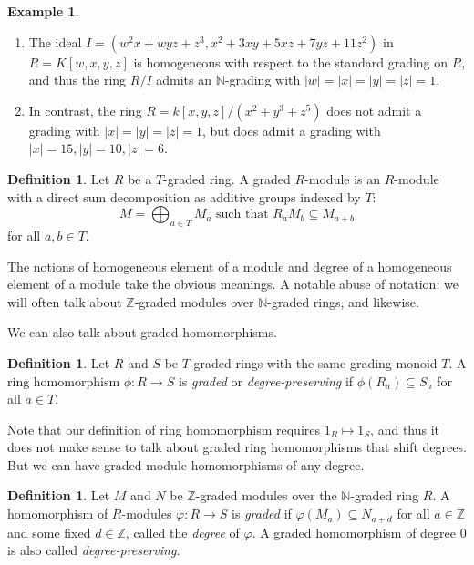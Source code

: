 \documentclass{amsart}[12pt]
\newcommand{\ZZ}{\mathbb{Z}}
\newcommand{\NN}{\mathbb{N}}
\numberwithin{equation}{section}
\theoremstyle{plain} %
\theoremstyle{definition}
\newtheorem{definition}[equation]{Definition}
\newtheorem{example}[equation]{Example}
\theoremstyle{remark}
\begin{document}
\begin{example}
	\begin{enumerate}
		
		\item The ideal $I = (w^2x+wyz+z^3,x^2+3xy+5xz+7yz+11z^2)$ in $R=K[w,x,y,z]$ is homogeneous with respect to the standard grading on $R$, and thus the ring $R/I$ admits an $\NN$-grading with $|w|=|x|=|y|=|z|=1$.
		
		\item In contrast, the ring $R=k[x,y,z]/(x^2+y^3+z^5)$ does not admit a grading with $|x|=|y|=|z|=1$, but does admit a grading with $|x|=15,|y|=10,|z|=6$.
	\end{enumerate}
\end{example}

\begin{definition}
Let $R$ be a $T$-graded ring. A graded $R$-module is an $R$-module with a direct sum decomposition as additive groups indexed by $T$:
	\[M=\bigoplus_{a\in T} M_a \textrm{ such that } R_a M_b \subseteq M_{a+b}\] for all $a,b\in T$.
	\end{definition}
	
	The notions of homogeneous element of a module and degree of a homogeneous element of a module take the obvious meanings. A notable abuse of notation: we will often talk about $\ZZ$-graded modules over $\NN$-graded rings, and likewise.
	
	We can also talk about graded homomorphisms.
	
\begin{definition}
Let $R$ and $S$ be $T$-graded rings with the same grading monoid $T$. A ring homomorphism $\phi:R\to S$ is {\em graded} or {\em degree-preserving}  if $\phi(R_a) \subseteq S_{a}$ for all $a \in T$.
\end{definition}

Note that our definition of ring homomorphism requires $1_R \mapsto 1_S$, and thus it does not make sense to talk about graded ring homomorphisms that shift degrees. But we can have graded module homomorphisms of any degree.

\begin{definition}	
Let $M$ and $N$ be $\ZZ$-graded modules over the $\NN$-graded ring $R$. A homomorphism of $R$-modules $\varphi:R\to S$ is {\em graded}  if $\varphi(M_a) \subseteq N_{a+d}$ for all $a \in \ZZ$ and some fixed $d \in \mathbb{Z}$, called the {\em degree} of $\varphi$. A graded homomorphism of degree $0$ is also called {\em degree-preserving}.
\end{definition}
\end{document}
